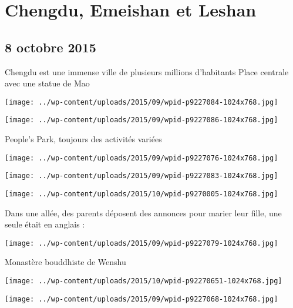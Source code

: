 \chapter{Chengdu, Emeishan et Leshan}
\section*{8 octobre 2015}
Chengdu est une immense ville de plusieurs millions d'habitants \newline
 Place centrale avec une statue de Mao \newline
 \newline
\centerline{\texttt{[image: ../wp-content/uploads/2015/09/wpid-p9227084-1024x768.jpg]} } 
 \newline
 \newline
\centerline{\texttt{[image: ../wp-content/uploads/2015/09/wpid-p9227086-1024x768.jpg]} } 
 \newline
 People's Park, toujours des activités variées \newline
 \newline
\centerline{\texttt{[image: ../wp-content/uploads/2015/09/wpid-p9227076-1024x768.jpg]} } 
 \newline
 \newline
\centerline{\texttt{[image: ../wp-content/uploads/2015/09/wpid-p9227083-1024x768.jpg]} } 
 \newline
 \newline
\centerline{\texttt{[image: ../wp-content/uploads/2015/10/wpid-p9270005-1024x768.jpg]} } 
 \newline
 Dans une allée, des parents déposent des annonces pour marier leur fille, une seule était en anglais : \newline
 \newline
\centerline{\texttt{[image: ../wp-content/uploads/2015/09/wpid-p9227079-1024x768.jpg]} } 
 \newline
 Monastère bouddhiste de Wenshu \newline
 \newline
\centerline{\texttt{[image: ../wp-content/uploads/2015/10/wpid-p92270651-1024x768.jpg]} } 
 \newline
 \newline
\centerline{\texttt{[image: ../wp-content/uploads/2015/09/wpid-p9227068-1024x768.jpg]} } 
 \newline
 \newline
